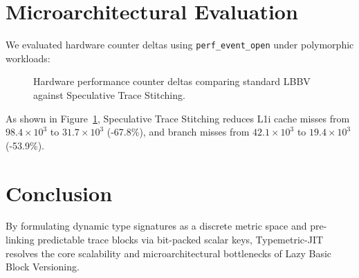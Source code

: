 \documentclass[10pt,journal,compsoc]{IEEEtran}
\begin{document}
\section{Microarchitectural Evaluation}

We evaluated hardware counter deltas using \texttt{perf\_event\_open} under polymorphic workloads:

\begin{figure}[htbp]
\centering

\caption{Hardware performance counter deltas comparing standard LBBV against Speculative Trace Stitching.}
\label{fig:counters}
\end{figure}

As shown in Figure~\ref{fig:counters}, Speculative Trace Stitching reduces L1i cache misses from $98.4 \times 10^3$ to $31.7 \times 10^3$ (-67.8\%), and branch misses from $42.1 \times 10^3$ to $19.4 \times 10^3$ (-53.9\%).

\section{Conclusion}
By formulating dynamic type signatures as a discrete metric space and pre-linking predictable trace blocks via bit-packed scalar keys, Typemetric-JIT resolves the core scalability and microarchitectural bottlenecks of Lazy Basic Block Versioning.



\end{document}
